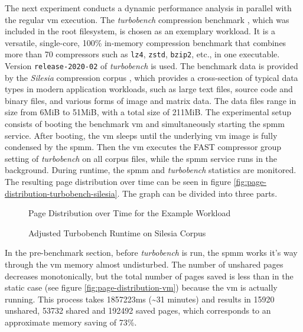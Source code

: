 The next experiment conducts a dynamic performance analysis in parallel with the regular \ac{vm} execution.
The \textit{turbobench} compression benchmark \cite{turbobench}, which was included in the root filesystem, is chosen as an exemplary workload.
It is a versatile, single-core, 100\% in-memory compression benchmark that combines more than 70 compressors such as \texttt{lz4}, \texttt{zstd}, \texttt{bzip2}, etc., in one executable.
Version \texttt{release-2020-02} of \textit{turbobench} is used.
The benchmark data is provided by the \textit{Silesia} compression corpus \cite{silesia-corpus}, which provides a cross-section of typical data types in modern application workloads, such as large text files, source code and binary files, and various forms of image and matrix data.
The data files range in size from 6MiB to 51MiB, with a total size of 211MiB.
The experimental setup consists of booting the benchmark \ac{vm} and simultaneously starting the \ac{spmm} service.
After booting, the \ac{vm} sleeps until the underlying \ac{vm} image is fully condensed by the \ac{spmm}.
Then the \ac{vm} executes the FAST compressor group setting of \textit{turbobench} on all corpus files, while the \ac{spmm} service runs in the background.
During runtime, the \ac{spmm} and \textit{turbobench} statistics are monitored.
The resulting page distribution over time can be seen in figure \ref{fig:page-distribution-turbobench-silesia}.
The graph can be divided into three parts.

\begin{figure}
  \centering
  
  \caption{Page Distribution over Time for the Example Workload}
  \label{fig:page-distribution-turbobench-silesia}
  \centering
  
  \caption{Adjusted Turbobench Runtime on Silesia Corpus}
  \label{fig:runtime-turbobench-silesia}
\end{figure}

In the pre-benchmark section, before \textit{turbobench} is run, the \ac{spmm} works it's way through the \ac{vm} memory almost undisturbed.
The number of unshared pages decreases monotonically, but the total number of pages saved is less than in the static case (see figure \ref{fig:page-distribution-vm}) because the \ac{vm} is actually running.
This process takes 1857223ms (\textasciitilde{}31 minutes) and results in 15920 unshared, 53732 shared and 192492 saved pages, which corresponds to an approximate memory saving of 73\%.

